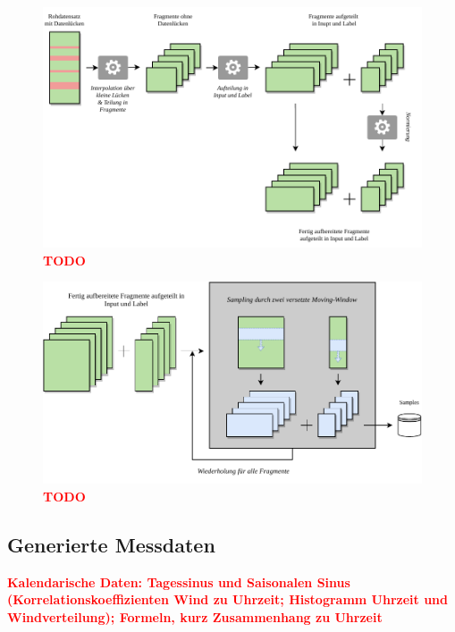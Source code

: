 \documentclass[
12pt, %
toc=listofnumbered, %
toc=chapterentrydotfill, %
numbers=noenddot, %
captions=tableheading, %
]{scrreprt}
\let\Oldsubsection\subsection
\renewcommand{\subsection}{\FloatBarrier\Oldsubsection}
\newcommand{\highlight}[1]{\textbf{\textcolor{red}{#1}}}
\begin{document}
\begin{figure}[tph]
	\begin{center}
		\includegraphics[]{./images/preprocessing.pdf}
		\caption{\highlight{{TODO}}}
		\label{fig:preprocessing}
	\end{center}
\end{figure}

\begin{figure}[tph]
	\begin{center}
		\includegraphics[]{./images/sampling.pdf}
		\caption{\highlight{{TODO}}}
		\label{fig:sampling}
	\end{center}
\end{figure}

\subsection{Generierte Messdaten}
\highlight{Kalendarische Daten: Tagessinus und Saisonalen Sinus (Korrelationskoeffizienten Wind zu Uhrzeit; Histogramm Uhrzeit und Windverteilung); 
Formeln, kurz Zusammenhang zu Uhrzeit}\\
\end{document}

